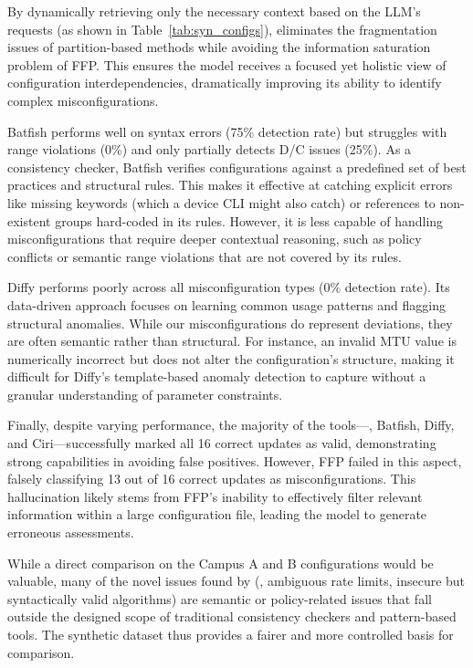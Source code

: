 By dynamically retrieving only the necessary context based on the LLM's requests (as shown in Table~\ref{tab:syn_configs}), \sysname{} eliminates the fragmentation issues of partition-based methods while avoiding the information saturation problem of FFP. This ensures the model receives a focused yet holistic view of configuration interdependencies, dramatically improving its ability to identify complex misconfigurations.

Batfish performs well on syntax errors (75\% detection rate) but struggles with range violations (0\%) and only partially detects D/C issues (25\%). As a consistency checker, Batfish verifies configurations against a predefined set of best practices and structural rules. This makes it effective at catching explicit errors like missing keywords (which a device CLI might also catch) or references to non-existent groups hard-coded in its rules. However, it is less capable of handling misconfigurations that require deeper contextual reasoning, such as policy conflicts or semantic range violations that are not covered by its rules.

Diffy performs poorly across all misconfiguration types (0\% detection rate). Its data-driven approach focuses on learning common usage patterns and flagging structural anomalies. While our misconfigurations do represent deviations, they are often semantic rather than structural. For instance, an invalid MTU value is numerically incorrect but does not alter the configuration's structure, making it difficult for Diffy’s template-based anomaly detection to capture without a granular understanding of parameter constraints.

Finally, despite varying performance, the majority of the tools—\sysname{}, Batfish, Diffy, and Ciri—successfully marked all 16 correct updates as valid, demonstrating strong capabilities in avoiding false positives. However, FFP failed in this aspect, falsely classifying 13 out of 16 correct updates as misconfigurations. This hallucination likely stems from FFP’s inability to effectively filter relevant information within a large configuration file, leading the model to generate erroneous assessments.

While a direct comparison on the Campus A and B configurations would be valuable, many of the novel issues found by \sysname{} (\eg, ambiguous rate limits, insecure but syntactically valid algorithms) are semantic or policy-related issues that fall outside the designed scope of traditional consistency checkers and pattern-based tools. The synthetic dataset thus provides a fairer and more controlled basis for comparison.